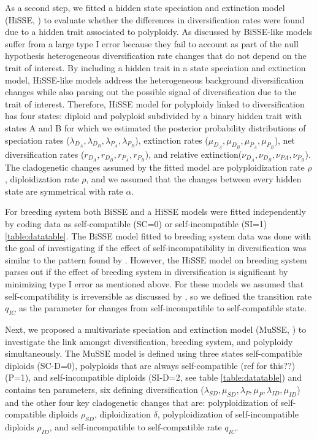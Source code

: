 As a second step, we fitted a hidden state speciation and extinction model (HiSSE, \citet{beaulieu_2016}) to evaluate whether the differences in diversification rates were found due to a hidden trait associated to polyploidy. As discussed by \citet{beaulieu_2016} BiSSE-like models suffer from a large type I error because they fail to account as part of the null hypothesis heterogeneous diversification rate changes  that do not depend on the trait of interest. By including a hidden trait in a state speciation and extinction  model,  HiSSE-like models address the heterogeneous background diversification changes while also parsing out the possible signal of diversification due to the trait of interest. Therefore, HiSSE model for polyploidy linked to diversification has four states: diploid and polyploid subdivided by a binary hidden trait with states A and B for which we estimated the posterior probability distributions of speciation rates ($\lambda_{D_A},\lambda_{D_B}, \lambda_{P_A},\lambda_{P_B}$), extinction rates ($\mu_{D_A},\mu_{D_B}, \mu_{P_A},\mu_{P_B}$),  net diversification rates ($r_{D_A},r_{D_B},r_{P_A},r_{P_B}$), and relative extinction($\nu_{D_A},\nu_{D_B}, \nu_{PA},\nu_{P_B}$). The cladogenetic changes assumed by the fitted model are polyploidization rate $\rho$, diploidization rate $\rho$, and we assumed that the changes between every hidden state are symmetrical with rate $\alpha$. \newline

For breeding system both BiSSE and a HiSSE models were fitted independently by coding data as self-compatible (SC=0) or self-incompatible (SI=1) \cref{table:datatable}. The BiSSE model fitted to breeding system data was done with the goal of investigating if the effect of self-incompatibility in diversification was similar to the pattern found by  \citet{goldberg_2012}. However, the HiSSE model on breeding system parses out if the effect of breeding system in diversification is significant  by minimizing type I error as mentioned above. For these models we assumed that self-compatibility is irreversible as discussed by \citet{igic_2013}, so we defined the transition rate $q_{IC}$ as the parameter for changes from self-incompatible to self-compatible state.\newline

Next, we proposed a multivariate speciation and extinction model (MuSSE, \citet{fitzjohn_2012}) to investigate the link amongst diversification, breeding system, and polyploidy simultaneously. The MuSSE model is defined using three states self-compatible diploids (SC-D=0), polyploids that are always self-compatible (ref for this??) (P=1), and self-incompatible diploids (SI-D=2, see table \cref{table:datatable}) and contains ten parameters, six defining diversification ($\lambda_{SD}, \mu_{SD},\lambda_{P},\mu_{P}, \lambda_{ID},\mu_{ID}$) and the other four key cladogenetic changes that are: polyploidization of self-compatible diploids $\rho_{SD}$, diploidization $\delta$, polyploidization of self-incompatible diploids $\rho_{ID}$, and self-incompatible to self-compatible rate $q_{IC}$.\newline

